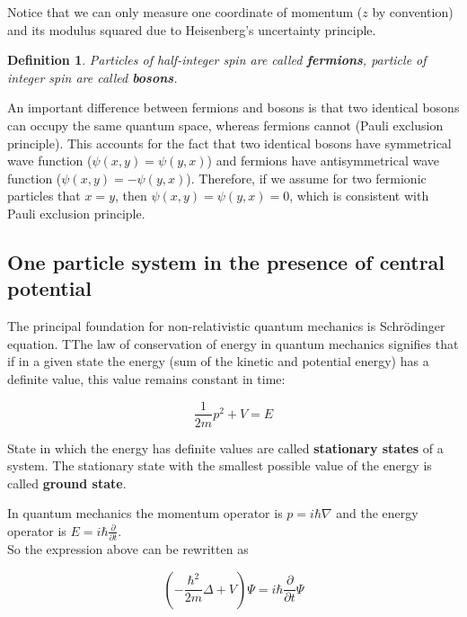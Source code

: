 \documentclass[11pt, a4paper, german]{article}
\newtheorem{definition}[theorem]{Definition}
\numberwithin{equation}{section}
\numberwithin{theorem}{section}
\begin{document}
Notice that we can only measure one coordinate of momentum ($z$ by convention) and its modulus squared due to Heisenberg's uncertainty principle.

\begin{definition}
Particles of half-integer spin are called \textbf{fermions}, particle of integer spin are called \textbf{bosons}.
\end{definition}

An important difference between fermions and bosons is that two identical bosons can occupy the same quantum space, whereas fermions cannot (Pauli exclusion principle). This accounts for the fact that two identical bosons have symmetrical wave function ($\psi(x, y) = \psi(y, x)$) and fermions have antisymmetrical wave function ($\psi(x, y) = -\psi(y, x)$). Therefore, if we assume for two fermionic particles that $x=y$, then $\psi(x,y)=\psi(y,x)=0$, which is consistent with Pauli exclusion principle.\\

\subsection{One particle system in the presence of central potential}

The principal foundation for non-relativistic quantum mechanics is Schrödinger equation. TThe law of conservation of energy in quantum mechanics signifies that if in a given state the energy (sum of the kinetic and potential energy) has a definite value, this value remains constant in time:

\begin{equation} \label{eq:energy}
\frac{1}{2m} p^2 + V = E
\end{equation}

State in which the energy has definite values are called \textbf{stationary states} of a system. The stationary state with the smallest possible value of the energy is called \textbf{ground state}.

In quantum mechanics the momentum operator is $p = i\hbar\nabla$ and the energy operator is $E = i\hbar \frac{\partial}{\partial t}$.\\

So the expression above can be rewritten as 

\begin{equation} \label{eq:schroedinger}
\left(- \frac{\hbar^2}{2m}\Delta + V\right)\Psi = i\hbar \frac{\partial}{\partial t} \Psi
\end{equation}
\end{document}
